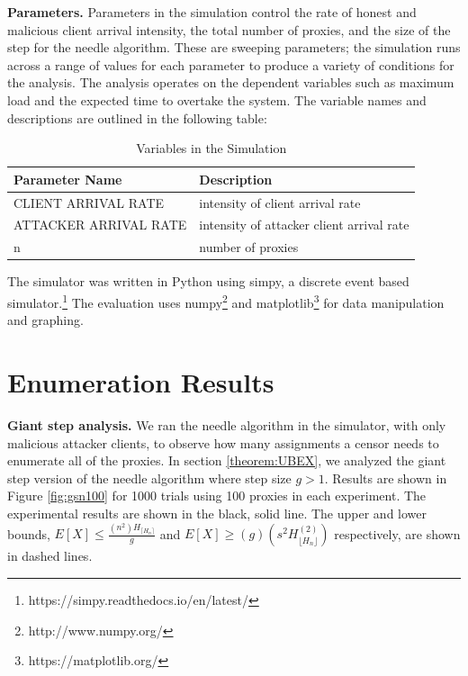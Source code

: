 
\textbf{Parameters.} Parameters in the simulation control the rate of honest and malicious client arrival intensity, the total number of proxies, and the size of the step for the needle algorithm. These are sweeping parameters; the simulation runs across a range of values for each parameter to produce a variety of conditions for the analysis. The analysis operates on the dependent variables such as maximum load and the expected time to overtake the system. The variable names and descriptions are outlined in the following table:

\begin{table}[h]
  \centering
	\begin{tabular}{ll}
	\hline
	\cline{1-2}
	Parameter Name   & Description  \\
	\hline
    CLIENT ARRIVAL RATE & intensity of client arrival rate \\
	ATTACKER ARRIVAL RATE      & intensity of attacker client arrival rate \\
	n     & number of proxies \\
	\hline
	\end{tabular}
  \caption{Variables in the Simulation}
  \label{tab:vars}
\end{table}

The simulator was written in Python using simpy, a discrete event based simulator.\footnote{https://simpy.readthedocs.io/en/latest/} The evaluation uses numpy\footnote{http://www.numpy.org/} and matplotlib\footnote{https://matplotlib.org/} for data manipulation and graphing.

\section{Enumeration Results}

\textbf{Giant step analysis.} We ran the needle algorithm in the simulator, with only malicious attacker clients, to observe how many assignments a censor needs to enumerate all of the proxies. In section \ref{theorem:UBEX}, we analyzed the giant step version of the needle algorithm where step size $g > 1$. Results are shown in Figure \ref{fig:gsn100} for 1000 trials using 100 proxies in each experiment. The experimental results are shown in the black, solid line. The upper and lower bounds, $E[X] \leq \frac{(n^2)H_{\lceil{H_n}\rceil}}{g}$ and $E[X] \geq (g)(s^2H^{(2)}_{\lfloor{H_n}\rfloor})$ respectively, are shown in dashed lines.

